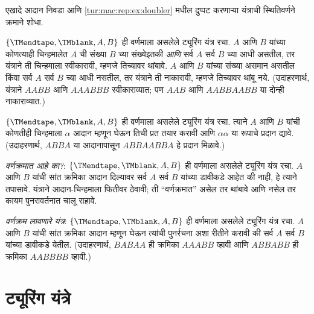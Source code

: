 \begin{prob}
एखादे आदान निवडा आणि \ref{tur:mac:rep:ex:doubler} मधील दुप्पट
करणाऱ्या यंत्राची स्थितिवर्णने क्रमाने शोधा.
\end{prob}

\begin{prob}
$\{\TMendtape,\TMblank, A, B\}$ ही वर्णमाला असलेले ट्यूरिंग यंत्र
रचा. $A$ आणि $B$ यांच्या कोणत्याही चिन्हमालेत $A$ ची संख्या $B$
च्या संख्येइतकी \emph{आणि} सर्व $A$ सर्व $B$ च्या आधी असतील,
तर यंत्राने ती चिन्हमाला स्वीकारावी, म्हणजे तिच्यावर थांबावे.
$A$ आणि $B$ यांच्या संख्या असमान असतील किंवा सर्व $A$ सर्व $B$
च्या आधी नसतील, तर यंत्राने ती नाकारावी, म्हणजे तिच्यावर थांबू नये.
(उदाहरणार्थ, यंत्राने $AABB$ आणि $AAABBB$ स्वीकाराव्यात; पण
$AAB$ आणि $AABBAABB$ या दोन्ही नाकाराव्यात.)
\end{prob}

\begin{prob}
$\{\TMendtape,\TMblank, A, B\}$ ही वर्णमाला असलेले ट्यूरिंग यंत्र
रचा. त्याने $A$ आणि $B$ यांची कोणतीही चिन्हमाला $\alpha$ आदान
म्हणून घेऊन तिची प्रत तयार करावी आणि $\alpha\alpha$ या रूपाचे
प्रदान द्यावे. (उदाहरणार्थ, $ABBA$ या आदानापासून $ABBAABBA$
हे प्रदान मिळावे.)
\end{prob}

\begin{prob}
\emph{वर्णक्रमात आहे का?}: $\{\TMendtape,\TMblank, A, B\}$ ही
वर्णमाला असलेले ट्यूरिंग यंत्र रचा. $A$ आणि $B$ यांची सांत
क्रमिका आदान दिल्यावर सर्व $A$ सर्व $B$ यांच्या डावीकडे आहेत की
नाही, हे त्याने तपासावे. यंत्राने आदान-चिन्हमाला फितीवर ठेवावी;
ती ``वर्णक्रमात'' असेल तर थांबावे आणि नसेल तर कायम पुनरावर्तनात
चालू राहावे.
\end{prob}

\begin{prob}
\emph{वर्णक्रम लावणारे यंत्र}: $\{\TMendtape,\TMblank, A, B\}$
ही वर्णमाला असलेले ट्यूरिंग यंत्र रचा. $A$ आणि $B$ यांची सांत
क्रमिका आदान म्हणून घेऊन त्यांची पुनर्रचना अशा रीतीने करावी की
सर्व $A$ सर्व $B$ यांच्या डावीकडे येतील. (उदाहरणार्थ, $BABAA$
ही क्रमिका $AAABB$ व्हावी आणि $ABBABB$ ही क्रमिका $AABBBB$
व्हावी.)
\end{prob}











\section{ट्यूरिंग यंत्रे}\label{tur:mac:tur:sec}

